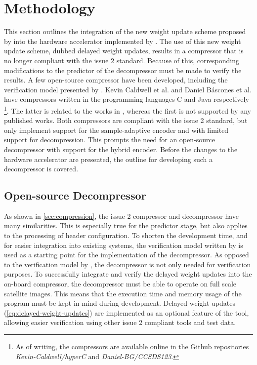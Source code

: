\chapter{Methodology}
\label{sec:implementation}

This section outlines the integration of the new weight update scheme proposed by \citeauthor{jiaRemovalFeedbackLoop2025} into the hardware accelerator implemented by \citeauthor{vorhaugHyperspectralImageCompression2024}. The use of this new weight update scheme, dubbed delayed weight updates, results in a compressor that is no longer compliant with the issue 2 standard. Because of this, corresponding modifications to the predictor of the decompressor must be made to verify the results. A few open-source compressor have been developed, including the verification model presented by \citeauthor{vorhaugHyperspectralImageCompression2024}. Kevin Caldwell et al. and Daniel Báscones et al. have compressors written in the programming languages C and Java respectively \footnote{As of writing, the compressors are available online in the Github repositories \textit{Kevin-Caldwell/hyperC} and \textit{Daniel-BG/CCSDS123}.}. The latter is related to the works in \cite{basconesRealTimeFPGAImplementation2022}, whereas the first is not supported by any published works. Both compressors are compliant with the issue 2 standard, but only implement support for the sample-adaptive encoder and with limited support for decompression. This prompts the need for an open-source decompressor with support for the hybrid encoder. Before the changes to the hardware accelerator are presented, the outline for developing such a decompressor is covered.

\section{Open-source Decompressor}

As shown in \autoref{sec:compression}, the issue 2 compressor and decompressor have many similarities. This is especially true for the predictor stage, but also applies to the processing of header configuration. To shorten the development time, and for easier integration into existing systems, the verification model written by \citeauthor{vorhaugHyperspectralImageCompression2024} is used as a starting point for the implementation of the decompressor. As opposed to the verification model by \citeauthor{vorhaugHyperspectralImageCompression2024}, the decompressor is not only needed for verification purposes. To successfully integrate and verify the delayed weight updates into the on-board compressor, the decompressor must be able to operate on full scale satellite images. This means that the execution time and memory usage of the program must be kept in mind during development. Delayed weight updates (\autoref{eq:delayed-weight-updates}) are implemented as an optional feature of the tool, allowing easier verification using other issue 2 compliant tools and test data.

